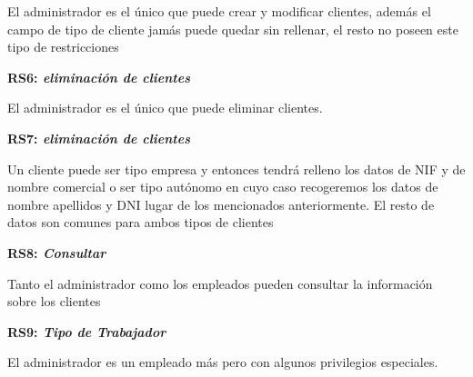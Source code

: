 \documentclass[paper=a4, fontsize=11pt, spanish]{scrartcl}
\begin{document}
El administrador es el único que puede crear y modificar clientes, además el campo de tipo de cliente jamás puede quedar sin rellenar, el resto no poseen este tipo de restricciones 


\setlength{\parindent}{0em}
\textbf{RS6: \textit{eliminación de clientes}}
\setlength{\parindent}{2em}

El administrador es el único que puede eliminar clientes.

\setlength{\parindent}{0em}
\textbf{RS7: \textit{eliminación de clientes}}
\setlength{\parindent}{2em}

Un cliente puede ser tipo empresa y entonces tendrá relleno los datos de NIF y de nombre comercial o ser tipo autónomo en cuyo caso recogeremos los datos de nombre apellidos y DNI lugar de los mencionados anteriormente. El resto de datos son comunes para ambos tipos de clientes


\setlength{\parindent}{0em}
\textbf{RS8: \textit{Consultar}}
\setlength{\parindent}{2em}

Tanto el administrador como los empleados pueden consultar la información sobre los clientes


\setlength{\parindent}{0em}
\textbf{RS9: \textit{Tipo de Trabajador}}
\setlength{\parindent}{2em}

El administrador es un empleado más pero con algunos privilegios especiales.
\end{document}
